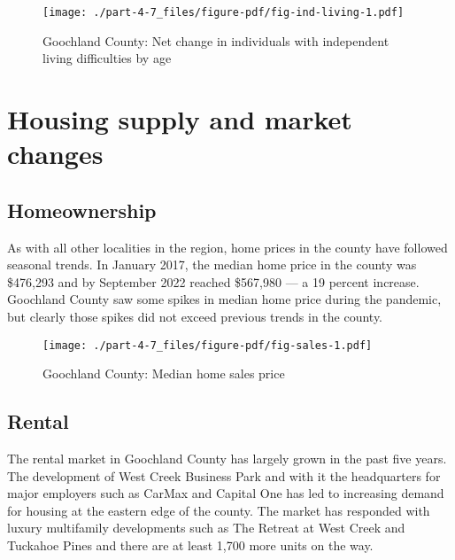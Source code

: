 \documentclass[
  letterpaper,
  DIV=11,
  numbers=noendperiod]{scrreprt}
\begin{document}
\begin{figure}

{\centering \texttt{[image: ./part-4-7\_files/figure-pdf/fig-ind-living-1.pdf]}

}

\caption{\label{fig-ind-living}Goochland County: Net change in
individuals with independent living difficulties by age}

\end{figure}

\hypertarget{housing-supply-and-market-changes-6}{%
\section{Housing supply and market
changes}\label{housing-supply-and-market-changes-6}}

\hypertarget{homeownership-6}{%
\subsection{Homeownership}\label{homeownership-6}}

As with all other localities in the region, home prices in the county
have followed seasonal trends. In January 2017, the median home price in
the county was \$476,293 and by September 2022 reached \$567,980 --- a
19 percent increase. Goochland County saw some spikes in median home
price during the pandemic, but clearly those spikes did not exceed
previous trends in the county.

\begin{figure}

{\centering \texttt{[image: ./part-4-7\_files/figure-pdf/fig-sales-1.pdf]}

}

\caption{\label{fig-sales}Goochland County: Median home sales price}

\end{figure}

\hypertarget{rental-6}{%
\subsection{Rental}\label{rental-6}}

The rental market in Goochland County has largely grown in the past five
years. The development of West Creek Business Park and with it the
headquarters for major employers such as CarMax and Capital One has led
to increasing demand for housing at the eastern edge of the county. The
market has responded with luxury multifamily developments such as The
Retreat at West Creek and Tuckahoe Pines and there are at least 1,700
more units on the way.
\end{document}
